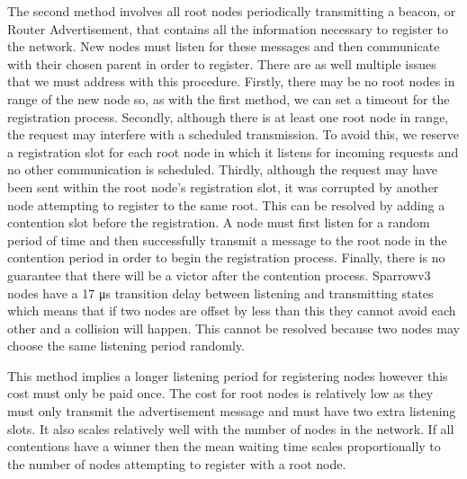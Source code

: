 The second method involves all root nodes periodically transmitting a beacon,
or Router Advertisement, that contains all the information necessary to
register to the network. New nodes must listen for these messages and then
communicate with their chosen parent in order to register.  There are as well
multiple issues that we must address with this procedure. Firstly, there may be
no root nodes in range of the new node so, as with the first method, we can set
a timeout for the registration process. Secondly, although there is at least
one root node in range, the request may interfere with a scheduled
transmission. To avoid this, we reserve a registration slot for each root node
in which it listens for incoming requests and no other communication is
scheduled. Thirdly, although the request may have been sent within the root
node's registration slot, it was corrupted by another node attempting to
register to the same root. This can be resolved by adding a contention slot
before the registration. A node must first listen for a random period of time
and then successfully transmit a message to the root node in the contention
period in order to begin the registration process. Finally, there is no
guarantee that there will be a victor after the contention process. Sparrowv3
nodes have a 17 μs transition delay between listening and transmitting states
which means that if two nodes are offset by less than this they cannot avoid
each other and a collision will happen.  This cannot be resolved because two
nodes may choose the same listening period randomly.

This method implies a longer listening period for registering nodes however
this cost must only be paid once. The cost for root nodes is relatively low as
they must only transmit the advertisement message and must have two extra
listening slots. It also scales relatively well with the number of nodes in the
network.  If all contentions have a winner then the mean waiting time scales
proportionally to the number of nodes attempting to register with a root node. 

\vspace{\baselineskip}

